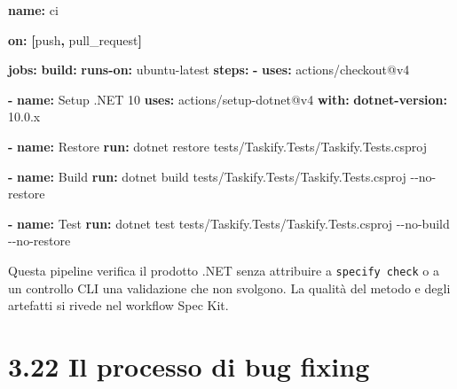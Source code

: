 \documentclass[
  italian,
  10pt,
]{book}
\newenvironment{Shaded}{\begin{snugshade}}{\end{snugshade}}
\newcommand{\AttributeTok}[1]{\textcolor[rgb]{0.13,0.29,0.53}{#1}}
\newcommand{\FunctionTok}[1]{\textcolor[rgb]{0.13,0.29,0.53}{\textbf{#1}}}
\newcommand{\KeywordTok}[1]{\textcolor[rgb]{0.13,0.29,0.53}{\textbf{#1}}}
\newcommand{\StringTok}[1]{\textcolor[rgb]{0.31,0.60,0.02}{#1}}
\begin{document}
\begin{Shaded}
\begin{Highlighting}[]
\FunctionTok{name}\KeywordTok{:}\AttributeTok{ ci}

\FunctionTok{on}\KeywordTok{:}\AttributeTok{ }\KeywordTok{[}\AttributeTok{push}\KeywordTok{,}\AttributeTok{ pull\_request}\KeywordTok{]}

\FunctionTok{jobs}\KeywordTok{:}
\AttributeTok{  }\FunctionTok{build}\KeywordTok{:}
\AttributeTok{    }\FunctionTok{runs{-}on}\KeywordTok{:}\AttributeTok{ ubuntu{-}latest}
\AttributeTok{    }\FunctionTok{steps}\KeywordTok{:}
\AttributeTok{      }\KeywordTok{{-} }\FunctionTok{uses}\KeywordTok{:}\AttributeTok{ actions/checkout@v4}

\AttributeTok{      }\KeywordTok{{-} }\FunctionTok{name}\KeywordTok{:}\AttributeTok{ Setup .NET 10}
\AttributeTok{        }\FunctionTok{uses}\KeywordTok{:}\AttributeTok{ actions/setup{-}dotnet@v4}
\AttributeTok{        }\FunctionTok{with}\KeywordTok{:}
\AttributeTok{          }\FunctionTok{dotnet{-}version}\KeywordTok{:}\AttributeTok{ }\StringTok{\textquotesingle{}10.0.x\textquotesingle{}}

\AttributeTok{      }\KeywordTok{{-} }\FunctionTok{name}\KeywordTok{:}\AttributeTok{ Restore}
\AttributeTok{        }\FunctionTok{run}\KeywordTok{:}\AttributeTok{ dotnet restore tests/Taskify.Tests/Taskify.Tests.csproj}

\AttributeTok{      }\KeywordTok{{-} }\FunctionTok{name}\KeywordTok{:}\AttributeTok{ Build}
\AttributeTok{        }\FunctionTok{run}\KeywordTok{:}\AttributeTok{ dotnet build tests/Taskify.Tests/Taskify.Tests.csproj {-}{-}no{-}restore}

\AttributeTok{      }\KeywordTok{{-} }\FunctionTok{name}\KeywordTok{:}\AttributeTok{ Test}
\AttributeTok{        }\FunctionTok{run}\KeywordTok{:}\AttributeTok{ dotnet test tests/Taskify.Tests/Taskify.Tests.csproj {-}{-}no{-}build {-}{-}no{-}restore}
\end{Highlighting}
\end{Shaded}

Questa pipeline verifica il prodotto .NET senza attribuire a
\texttt{specify\ check} o a un controllo CLI una validazione che non
svolgono. La qualità del metodo e degli artefatti si rivede nel workflow
Spec Kit.

\section{3.22 Il processo di bug
fixing}\label{il-processo-di-bug-fixing}
\end{document}
